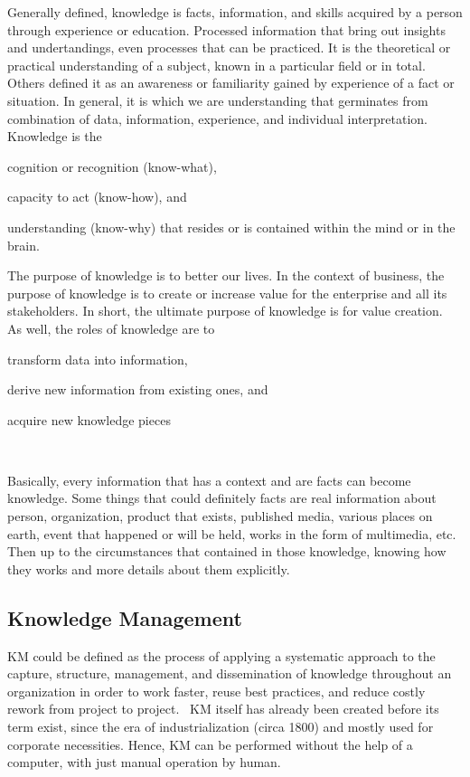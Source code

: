 Generally defined, knowledge is facts, information, and skills acquired by a person through experience or education.
Processed information that bring out insights and undertandings, even processes that can be practiced.
It is the theoretical or practical understanding of a subject, known in a particular field or in total.
Others defined it as an awareness or familiarity gained by experience of a fact or situation.
In general, it is which we are understanding that germinates from combination of data, information, experience, and individual interpretation.~\autocite{BD2015Knowledge}
Knowledge is the
\begin{inparaenum}
\item cognition or recognition (know-what),
\item capacity to act (know-how), and
\item understanding (know-why) that resides or is contained within the mind or in the brain.
\end{inparaenum}
The purpose of knowledge is to better our lives.
In the context of business, the purpose of knowledge is to create or increase value for the enterprise and all its stakeholders.
In short, the ultimate purpose of knowledge is for value creation.~\autocite{Liew2007Understanding}
As well, the roles of knowledge are to
\begin{inparaenum}
\item transform data into information,
\item derive new information from existing ones, and
\item acquire new knowledge pieces
\end{inparaenum}~\autocite{Pomerol2001Relation}

Basically, every information that has a context and are facts can become knowledge.
Some things that could definitely facts are real information about person, organization, product that exists, published media, various places on earth, event that happened or will be held, works in the form of multimedia, etc.
Then up to the circumstances that contained in those knowledge, knowing how they works and more details about them explicitly.

\subsection{Knowledge Management}

\ac{KM} could be defined as the process of applying a systematic approach to the capture, structure, management, and dissemination of knowledge throughout an organization in order to work faster, reuse best practices, and reduce costly rework from project to project.~\autocite{Dalkir2005KM}
\ac{KM} itself has already been created before its term exist, since the era of industrialization (circa 1800) and mostly used for corporate necessities.
Hence, \ac{KM} can be performed without the help of a computer, with just manual operation by human.

